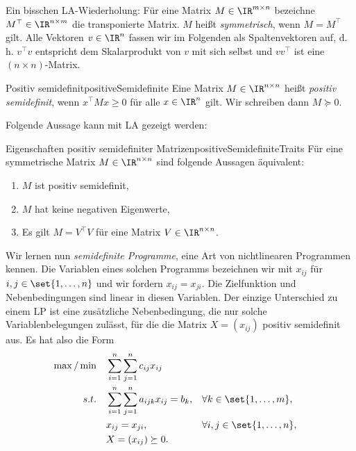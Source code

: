 \documentclass[language=ngerman,algolist]{TemplateLecture}
\begin{document}
Ein bisschen LA-Wiederholung: Für eine Matrix $M \in \IR^{m \times n}$ bezeichne $M^\top \in \IR^{n \times m}$ die transponierte Matrix. $M$ heißt \emph{symmetrisch}, wenn $M = M^\top$ gilt. Alle Vektoren $v \in \IR^n$ fassen wir im Folgenden als Spaltenvektoren auf, d. h. $v^\top v$ entspricht dem Skalarprodukt von $v$ mit sich selbst und $v v^\top$ ist eine $(n \times n)$-Matrix.

\begin{defi}{Positiv semidefinit}{positiveSemidefinite}
    Eine Matrix $M \in \IR^{n \times n}$ heißt \emph{positiv semidefinit}, wenn $x^\top M x \geq 0$ für alle $x \in \IR^n$ gilt. Wir schreiben dann $M \succeq 0$.
\end{defi}

Folgende Aussage kann mit LA gezeigt werden:

\begin{lem}{Eigenschaften positiv semidefiniter Matrizen}{positiveSemidefiniteTraits}
    Für eine symmetrische Matrix $M \in \IR^{n \times n}$ sind folgende Aussagen äquivalent:
    \begin{enumerate}[$(i)$]
        \item $M$ ist positiv semidefinit,
        \item $M$ hat keine negativen Eigenwerte,
        \item Es gilt $M = V^\top V$ für eine Matrix $V \in \IR^{n \times n}$.
    \end{enumerate}
\end{lem}

Wir lernen nun \emph{semidefinite Programme}, eine Art von nichtlinearen Programmen kennen. Die Variablen eines solchen Programms bezeichnen wir mit $x_{ij}$ für $i, j \in \set{1, \ldots, n}$ und wir fordern $x_{ij} = x_{ji}$. Die Zielfunktion und Nebenbedingungen sind linear in diesen Variablen. Der einzige Unterschied zu einem LP ist eine zusätzliche Nebenbedingung, die nur solche Variablenbelegungen zulässt, für die die Matrix $X = (x_{ij})$ positiv semidefinit aus. Es hat also die Form 
\begin{equation}
    \begin{aligned}
        \max/\min \quad & \sum_{i = 1}^n \sum_{j = 1}^n c_{ij} x_{ij} \\ 
        s.t. \quad & \sum_{i=1}^n \sum_{j=1}^n a_{ijk} x_{ij} = b_k, && \forall k \in \set{1,\ldots,m}, \\
        & x_{ij} = x_{ji}, && \forall i,j \in \set{1,\ldots,n}, \\ 
        & X = (x_{ij}) \succeq 0.
    \end{aligned}\label{eq:semidefiniteProgram}
\end{equation}
\end{document}
